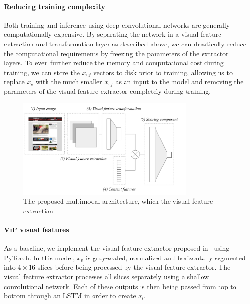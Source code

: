 
\paragraph{Reducing training complexity}
Both training and inference using deep convolutional networks are generally computationally expensive.
By separating the network in a visual feature extraction and transformation layer as described above, we can drastically reduce the computational requirements by freezing the parameters of the extractor layers.
To even further reduce the memory and computational cost during training, we can store the $x_{vf}$ vectors to disk prior to training, allowing us to replace $x_{v}$ with the much smaller $x_{vf}$ as an input to the model and removing the parameters of the visual feature extractor completely during training.




\begin{figure}[t]
\includegraphics[width = 3.5in]{images/multimodelarchitecture.pdf}
\caption{The proposed multimodal architecture, which the visual feature extraction}
\label{fig:multimodelarchitecture}
\end{figure}

\paragraph{ViP visual features}
As a baseline, we implement the visual feature extractor proposed in~\citet{fan2017learning} using PyTorch.
In this model, $x_{v}$ is gray-scaled, normalized and horizontally segmented into $4\times16$ slices before being processed by the visual feature extractor. The visual feature extractor processes all slices separately using a shallow convolutional network.
Each of these outputs is then being passed from top to bottom through an LSTM in order to create $x_{l}$.

